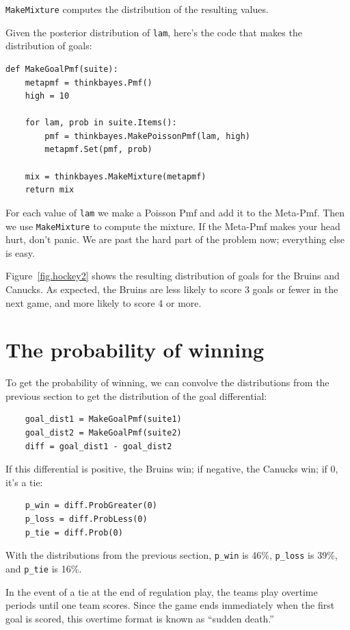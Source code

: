 \documentclass[12pt]{book}
\begin{document}
\verb"MakeMixture" computes the distribution of the resulting
values.

Given the posterior distribution of {\tt lam}, here's the code
that makes the distribution of goals:

\begin{verbatim}
def MakeGoalPmf(suite):
    metapmf = thinkbayes.Pmf()
    high = 10

    for lam, prob in suite.Items():
        pmf = thinkbayes.MakePoissonPmf(lam, high)
        metapmf.Set(pmf, prob)

    mix = thinkbayes.MakeMixture(metapmf)
    return mix
\end{verbatim}  

For each value of {\tt lam} we make a Poisson Pmf and add it to the
Meta-Pmf.  Then we use \verb"MakeMixture" to compute the mixture.  If
the Meta-Pmf makes your head hurt, don't panic.  We are past the hard
part of the problem now; everything else is easy.

Figure~\ref{fig.hockey2} shows the resulting distribution of goals for
the Bruins and Canucks.  As expected, the Bruins are less likely to
score 3 goals or fewer in the next game, and more likely to score 4 or
more.

\section{The probability of winning}

To get the probability of winning, we can convolve the distributions
from the previous section to get the distribution of the goal
differential:

\begin{verbatim}
    goal_dist1 = MakeGoalPmf(suite1)
    goal_dist2 = MakeGoalPmf(suite2)
    diff = goal_dist1 - goal_dist2
\end{verbatim}  

If this differential is positive, the Bruins win; if negative,
the Canucks win; if 0, it's a tie:

\begin{verbatim}
    p_win = diff.ProbGreater(0)
    p_loss = diff.ProbLess(0)
    p_tie = diff.Prob(0)
\end{verbatim}  

With the distributions from the previous section, \verb"p_win"
is 46\%, \verb"p_loss" is 39\%, and \verb"p_tie" is 16\%.

In the event of a tie at the end of regulation play, the teams play
overtime periods until one team scores.  Since the game ends
immediately when the first goal is scored, this overtime format
is known as ``sudden death.''
\end{document}
